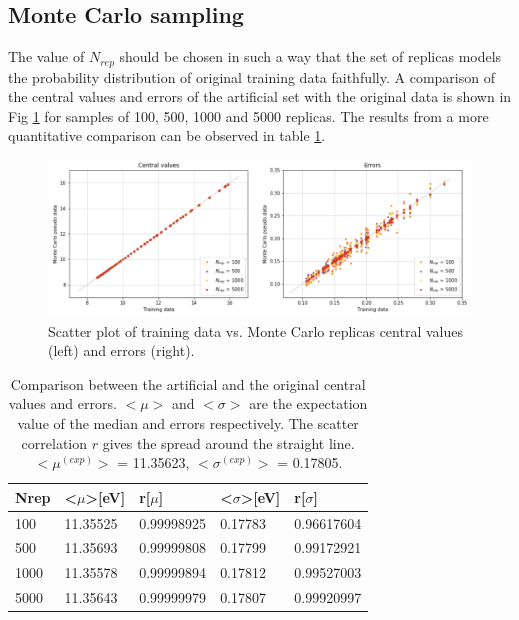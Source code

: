 \documentclass[11pt,a4paper]{article}
\numberwithin{equation}{section}
\numberwithin{figure}{section}
\numberwithin{table}{section}
\begin{document}
\subsection{Monte Carlo sampling}
The value of $N_{rep}$ should be chosen in such a way that the set of replicas models the probability distribution of original training data faithfully. A comparison of the central values and errors of the artificial set with the original data is shown in Fig \ref{mc} for samples of 100, 500, 1000 and 5000 replicas. The results from a more quantitative comparison can be observed in table \ref{tablemc}.

\begin{figure}[H]
    \centering 
    \includegraphics[width=160mm]{plots/MC.png}
    \caption{Scatter plot of training data vs. Monte Carlo replicas central values (left) and errors (right). }
    \label{mc}
\end{figure}

\begin{table}[H]
\centering
\begin{tabular}{|l|ll|ll|}
\hline
Nrep & \textless{}$\mu$\textgreater {[}eV{]} & r{[}$\mu${]} & \textless{}$\sigma$\textgreater {[}eV{]} & r{[}$\sigma${]} \\ \hline
100  & 11.35525                              & 0.99998925   & 0.17783                                  & 0.96617604      \\ \hline
500  & 11.35693                              & 0.99999808   & 0.17799                                  & 0.99172921      \\ \hline
1000 & 11.35578                              & 0.99999894   & 0.17812                                  & 0.99527003      \\ \hline
5000 & 11.35643                              & 0.99999979   & 0.17807                                  & 0.99920997      \\ \hline
\end{tabular}
\caption{Comparison between the artificial and the original central values and errors. $<\mu>$ and $<\sigma>$ are the expectation value of the median and errors respectively. The scatter correlation $r$ gives the spread around the straight line. $<\mu^{(exp)}>$ = 11.35623, $<\sigma^{(exp)}>$ = 0.17805. }
\label{tablemc}
\end{table}
\end{document}
